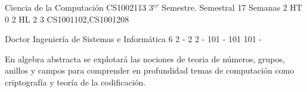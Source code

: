 \documentclass[a4paper,8pt]{article}
\begin{document}
\setNombreProfesor{}
\setGradoProfesorAbreviado{}
\sylabusHeader

\academicaTable
{Ciencia de la Computación} %
{CS1002113} %
{3$^{er}$ Semestre.} %
{Semestral} %
{17 Semanas} %
{2 HT} %
{} %
{0} %
{2 HL}  %
{2} %
{3} %
{CS1001102,CS1001208} %

\administrativaTable
{Doctor} %
{Ingeniería de Sistemas e Informática} %
{6} %
{2} %
{-} %
{2} %
{2} %
{-} %
{101} %
{-} %
{101} %
{101} %
{-} %


\begin{fundamentacion}
En algebra abstracta se explotará las nociones de teoria de números, grupos, anillos y campos para comprender en profundidad temas de computación como criptografía y teoría de la codificación.

\end{fundamentacion}

\begin{sumilla}
\item 
\item 
\item \IASCryptography
\item 

\end{sumilla}

\begin{competenciasAsignatura}
\item {}
\item {}
\item {}
\item {}

\end{competenciasAsignatura}
\end{document}
